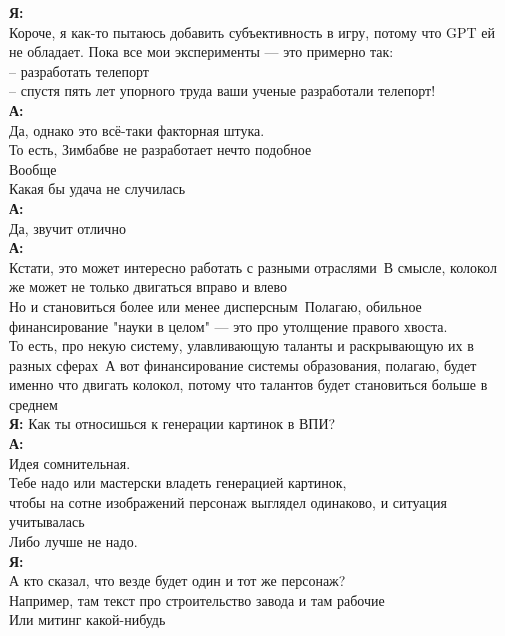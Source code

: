 \textbf{Я:}\\
Короче, я как-то пытаюсь добавить субъективность в игру, потому что GPT ей не обладает. Пока все мои эксперименты — это примерно так:\\
– разработать телепорт\\
– спустя пять лет упорного труда ваши ученые разработали телепорт!\\

\textbf{А:}\\
Да, однако это всё-таки факторная штука.\\
То есть, Зимбабве не разработает нечто подобное\\
Вообще\\
Какая бы удача не случилась\\

\textbf{А:}\\
Да, звучит отлично\\

\textbf{А:}\\
Кстати, это может интересно работать с разными отраслями\
В смысле, колокол же может не только двигаться вправо и влево\\
Но и становиться более или менее дисперсным\
Полагаю, обильное финансирование "науки в целом" — это про утолщение правого хвоста.\\
То есть, про некую систему, улавливающую таланты и раскрывающую их в разных сферах\
А вот финансирование системы образования, полагаю, будет именно что двигать колокол, потому что талантов будет становиться больше в среднем\\

\textbf{Я:} Как ты относишься к генерации картинок в ВПИ?\\

\textbf{А:}\\
Идея сомнительная.\\
Тебе надо или мастерски владеть генерацией картинок,\\
чтобы на сотне изображений персонаж выглядел одинаково, и ситуация учитывалась\\
Либо лучше не надо.\\

\textbf{Я:}\\
А кто сказал, что везде будет один и тот же персонаж?\\
Например, там текст про строительство завода и там рабочие\\
Или митинг какой-нибудь\\

